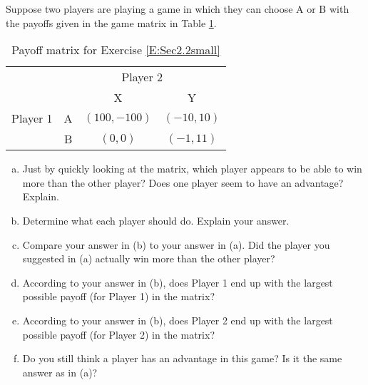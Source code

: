 \begin{xca}\label{E:Sec2.2small} Suppose two players are playing a game in which they can choose A or B with the payoffs given in the game matrix in Table \ref{T:matrixEx1Sec2.2}.


\begin{table}[h]
\centering

\begin{tabular}{cccc}
                      & \multicolumn{3}{c}{Player 2}                                                  \\ \cline{2-4} 
\multicolumn{1}{l|}{} & \multicolumn{1}{l|}{} & \multicolumn{1}{c|}{X} & \multicolumn{1}{c|}{Y} \\ \cline{2-4} 
\multicolumn{1}{l|}{Player 1} & \multicolumn{1}{c|}{A} & \multicolumn{1}{c|}{$(100, -100)$} & \multicolumn{1}{c|}{$(-10, 10)$} \\ \cline{2-4} 
\multicolumn{1}{l|}{} & \multicolumn{1}{c|}{B} & \multicolumn{1}{c|}{$(0, 0)$} & \multicolumn{1}{c|}{$(-1, 11)$} \\ \cline{2-4} 
\end{tabular}
\caption{Payoff matrix for Exercise \ref{E:Sec2.2small}}
\label{T:matrixEx1Sec2.2}
\end{table}

\begin{enumerate}[(a)]
\item Just by quickly looking at the matrix, which player appears to be able to win more than the other player? Does one player seem to have an advantage? Explain.
\item Determine what each player should do. Explain your answer.
\item Compare your answer in (b) to your answer in (a). Did the player you suggested in (a) actually win more than the other player?
\item According to your answer in (b), does Player 1 end up with the largest possible payoff (for Player 1) in the matrix?
\item According to your answer in (b), does Player 2 end up with the largest possible payoff (for Player 2) in the matrix?
\item Do you still think a player has an advantage in this game? Is it the same answer as in (a)?
\end{enumerate}
\end{xca}
\vspace{.5in}

